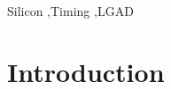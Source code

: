 \documentclass[preprint,1p]{elsarticle}
\begin{document}
\begin{frontmatter}
\begin{keyword}

Silicon \sep Timing \sep LGAD

\end{keyword}

\end{frontmatter}

\tableofcontents


\section{Introduction}

%
\end{document}
